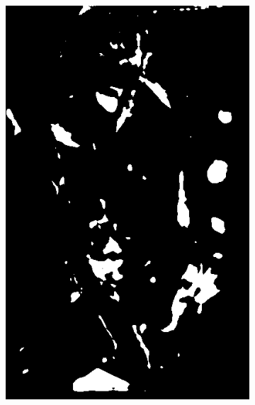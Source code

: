 \begin{figure}[h]
{\begin{subfigure}[b]{0.23\textwidth}
         \includegraphics[width=\textwidth]{images/results/cross_st/linda_rgb_dark_light_skinny_293.png}
     \end{subfigure}
    \hfill
     \begin{subfigure}[b]{0.23\textwidth}
         \centering

\end{subfigure}}
\end{figure}
